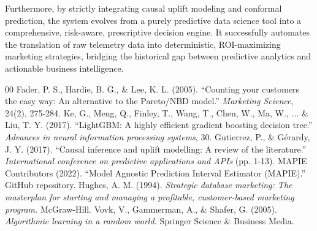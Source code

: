 \documentclass[10pt,conference]{IEEEtran}
\begin{document}
Furthermore, by strictly integrating causal uplift modeling and conformal prediction, the system evolves from a purely predictive data science tool into a comprehensive, risk-aware, prescriptive decision engine. It successfully automates the translation of raw telemetry data into deterministic, ROI-maximizing marketing strategies, bridging the historical gap between predictive analytics and actionable business intelligence.

\begin{thebibliography}{00}
 Fader, P. S., Hardie, B. G., \& Lee, K. L. (2005). ``Counting your customers the easy way: An alternative to the Pareto/NBD model.'' \textit{Marketing Science}, 24(2), 275-284.
 Ke, G., Meng, Q., Finley, T., Wang, T., Chen, W., Ma, W., ... \& Liu, T. Y. (2017). ``LightGBM: A highly efficient gradient boosting decision tree.'' \textit{Advances in neural information processing systems}, 30.
 Gutierrez, P., \& G\'erardy, J. Y. (2017). ``Causal inference and uplift modelling: A review of the literature.'' \textit{International conference on predictive applications and APIs} (pp. 1-13).
 MAPIE Contributors (2022). ``Model Agnostic Prediction Interval Estimator (MAPIE).'' GitHub repository.
 Hughes, A. M. (1994). \textit{Strategic database marketing: The masterplan for starting and managing a profitable, customer-based marketing program.} McGraw-Hill.
 Vovk, V., Gammerman, A., \& Shafer, G. (2005). \textit{Algorithmic learning in a random world.} Springer Science \& Business Media.
\end{thebibliography}
\end{document}
